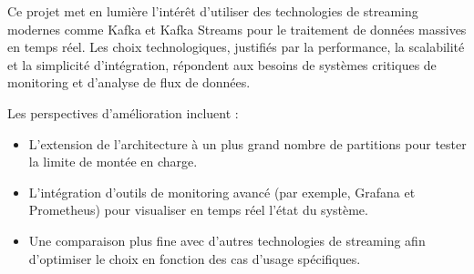 Ce projet met en lumière l’intérêt d’utiliser des technologies de streaming modernes comme Kafka et Kafka Streams pour le traitement de données massives en temps réel.
Les choix technologiques, justifiés par la performance, la scalabilité et la simplicité d’intégration, répondent aux besoins de systèmes critiques de monitoring et d’analyse de flux de données.

Les perspectives d’amélioration incluent :
\begin{itemize}
    \item L’extension de l’architecture à un plus grand nombre de partitions pour tester la limite de montée en charge.
    \item L’intégration d’outils de monitoring avancé (par exemple, Grafana et Prometheus) pour visualiser en temps réel l’état du système.
    \item Une comparaison plus fine avec d’autres technologies de streaming afin d’optimiser le choix en fonction des cas d’usage spécifiques.
\end{itemize}



